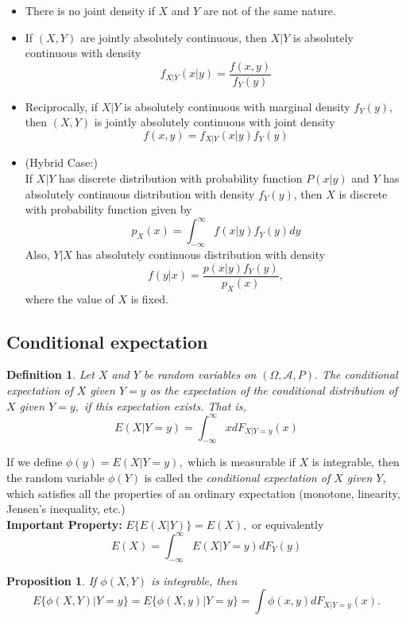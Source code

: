 \documentclass[12pt]{report} \addtolength{\textheight}{2in}
\newtheorem{defn}{Definition}
\newtheorem{prop}{Proposition}
\newcommand{\totalint}{\int_{-\infty}^{\infty}}
\newcommand{\bigA}{\mathcal{A}}
\newcommand{\probsp}{(\Omega, \bigA, P)}
\begin{document}
\begin{itemize}
\item There is no joint density if $X$ and $Y$ are not of the same nature.
\item If $(X,Y)$ are jointly absolutely continuous, then $X|Y$ is absolutely continuous with density
\begin{displaymath}
f_{X|Y}(x|y)=\frac{f(x,y)}{f_Y(y)}
\end{displaymath}
\item Reciprocally, if $X|Y$ is absolutely continuous with marginal density $f_Y(y),$ then $(X,Y)$ is jointly absolutely continuous with joint density
\begin{displaymath}
f(x,y)=f_{X|Y}(x|y)f_Y(y)
\end{displaymath}
\item (Hybrid Case:)\\
If $X|Y$ has discrete distribution with probability function $P(x|y)$ and $Y$ has absolutely continuous distribution with density $f_Y(y)$, then $X$ is discrete with probability function given by 
\begin{displaymath}
p_{X}(x)=\totalint f(x|y)f_Y(y)dy
\end{displaymath} 
Also, $Y|X$ has absolutely continuous distribution with density
\begin{displaymath}
f(y|x)=\frac{p(x|y)f_Y(y)}{p_X(x)},
\end{displaymath}
where the value of $X$ is fixed.
\end{itemize}
\subsection*{Conditional expectation}
\begin{defn}
Let $X$ and $Y$ be random variables on $\probsp.$ The conditional expectation of $X$ given $Y=y$ os the expectation of the conditional distribution of $X$ given $Y=y,$ if this expectation exists. That is,
\begin{displaymath}
E(X|Y=y)=\totalint x dF_{X|Y=y}(x)
\end{displaymath}
\end{defn}
If we define $\phi(y)=E(X|Y=y),$ which is measurable if $X$ is integrable, then the random variable $\phi(Y)$ is called the \textit{conditional expectation of $X$ given $Y$,} which satisfies all the properties of an ordinary expectation (monotone, linearity, Jensen's inequality, etc.)\\
\textbf{Important Property:} $E\{E(X|Y)\}=E(X),$ or equivalently
\begin{displaymath}
E(X)=\totalint E(X|Y=y)dF_Y(y)
\end{displaymath}
\begin{prop}
If $\phi(X,Y)$ is integrable, then
\begin{displaymath}
E\{\phi(X,Y)|Y=y\}=E\{\phi(X,y)|Y=y\}=\int \phi(x,y)dF_{X|Y=y}(x).
\end{displaymath}
\end{prop}
\end{document}
